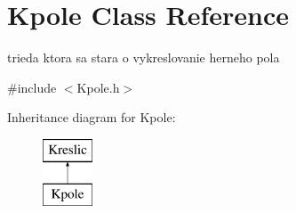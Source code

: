 \hypertarget{class_kpole}{\section{Kpole Class Reference}
\label{class_kpole}
}


trieda ktora sa stara o vykreslovanie herneho pola  




{\ttfamily \#include $<$Kpole.\-h$>$}

Inheritance diagram for Kpole\-:\begin{figure}[H]
\begin{center}
\leavevmode
\includegraphics[height=2.000000cm]{class_kpole}
\end{center}
\end{figure}
